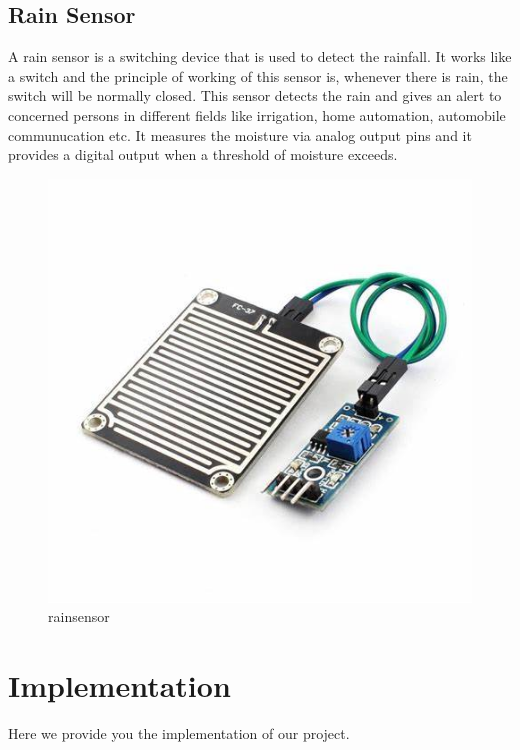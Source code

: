 \documentclass[conference]{IEEEtran}
\begin{document}
\subsection{Rain Sensor}
 A rain sensor is a switching device that is used to detect the rainfall. It works like a switch and the principle of working of this sensor is, whenever there is rain, the switch will be normally closed. This sensor detects the rain and gives an alert to concerned persons in different fields like irrigation, home automation, automobile communucation etc. It measures the moisture via analog output pins and it provides a digital output when a threshold of moisture exceeds.
 \begin{figure}
     \centering
     \includegraphics[width=0.5\linewidth]{rainsensor.png}
     \caption{ rainsensor}
     \label{fig:enter-label}
 \end{figure}

\section{Implementation}

Here we provide you the implementation of our project.
\end{document}
